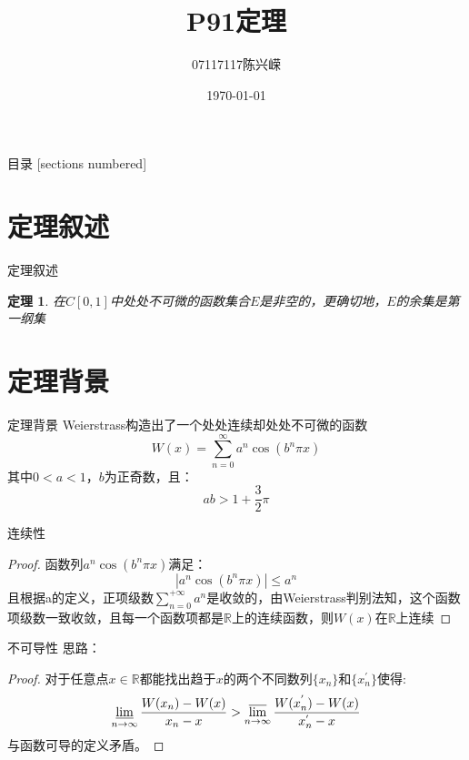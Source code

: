 \documentclass[10pt]{beamer}
\title{P91定理}
\subtitle{}
\date{\today}
\author{07117117陈兴嵘}
\institute{}
\newtheorem{theo}{定理}
\begin{document}
\maketitle

\begin{frame}{目录}
  [sections numbered]
  \tableofcontents[hideallsubsections]
\end{frame}

\section{定理叙述}

\begin{frame}[fragile]{定理叙述}
\begin{theo}
  在$C[0,1]$中处处不可微的函数集合$E$是非空的，更确切地，$E$的余集是第一纲集\cite{Knuth92}
\end{theo}
\end{frame}
\section{定理背景}
\begin{frame}[fragile]{定理背景}
Weierstrass构造出了一个处处连续却处处不可微的函数
\begin{equation}\label{}
  W(x)=\sum_{n=0}^{\infty}a^n\cos(b^n\pi x)
\end{equation}
其中$0<a<1$，$b$为正奇数，且：
\begin{equation}\label{}
  ab>1+\frac{3}{2}\pi
\end{equation}
\end{frame}

\begin{frame}[fragile]{连续性}
\begin{proof}
  函数列$a^n\cos(b^n\pi x)$满足：
  \begin{equation}\label{}
    |a^n\cos(b^n\pi x)|\leq a^n
  \end{equation}
  且根据a的定义，正项级数$\sum_{n=0}^{+\infty}a^n$是收敛的，由Weierstrass判别法知，这个函数项级数一致收敛，且每一个函数项都是$\mathbb{R}$上的连续函数，则$W(x)$在$\mathbb{R}$上连续
\end{proof}
\end{frame}
\begin{frame}[fragile]{不可导性}
思路：
\begin{proof}
  对于任意点$x\in\mathbb{R}$都能找出趋于$x$的两个不同数列$\{x_n\}$和$\{x_n^{'}\}$使得:
  \begin{equation}\label{}
    \varliminf_{n\to\infty}\frac{W(x_n)-W(x)}{x_n-x}>\varlimsup_{n\to\infty}\frac{W(x^{'}_n)-W(x)}{x^{'}_n-x}
  \end{equation}
  与函数可导的定义矛盾。
\end{proof}
\end{frame}
\end{document}
